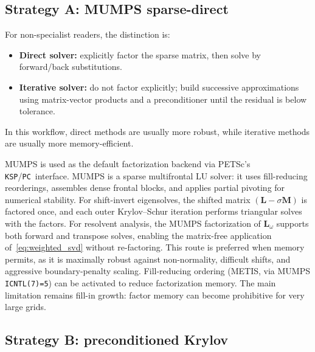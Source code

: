 \documentclass[11pt]{article}
\newcommand{\bL}{\mathbf{L}}
\newcommand{\bM}{\mathbf{M}}
\newcommand{\KSP}{\texttt{KSP}}
\newcommand{\PC}{\texttt{PC}}
\begin{document}
\subsection{Strategy A: MUMPS sparse-direct}
\label{sec:mumps}

For non-specialist readers, the distinction is:
\begin{itemize}
\item \textbf{Direct solver:} explicitly factor the sparse matrix, then solve by forward/back substitutions.
\item \textbf{Iterative solver:} do not factor explicitly; build successive approximations using matrix-vector products and a preconditioner until the residual is below tolerance.
\end{itemize}
In this workflow, direct methods are usually more robust, while iterative methods are usually more memory-efficient.

MUMPS \cite{amestoy2001mumps} is used as the default factorization backend via PETSc's \KSP/\PC\ interface.
MUMPS is a sparse multifrontal LU solver: it uses fill-reducing reorderings, assembles dense frontal blocks, and applies partial pivoting for numerical stability.
For shift-invert eigensolves, the shifted matrix $(\bL - \sigma\bM)$ is factored once, and each outer Krylov--Schur iteration performs triangular solves with the factors.
For resolvent analysis, the MUMPS factorization of $\bL_\omega$ supports both forward and transpose solves, enabling the matrix-free application of~\eqref{eq:weighted_svd} without re-factoring.
This route is preferred when memory permits, as it is maximally robust against non-normality, difficult shifts, and aggressive boundary-penalty scaling.
Fill-reducing ordering (METIS, via MUMPS \texttt{ICNTL(7)=5}) can be activated to reduce factorization memory.
The main limitation remains fill-in growth: factor memory can become prohibitive for very large grids.

\subsection{Strategy B: preconditioned Krylov}
\label{sec:iterative}
\end{document}
